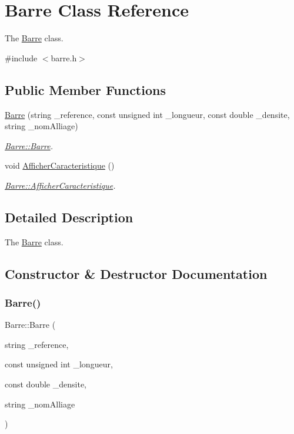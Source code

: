 \hypertarget{class_barre}{}\section{Barre Class Reference}
\label{class_barre}


The \hyperlink{class_barre}{Barre} class.  




{\ttfamily \#include $<$barre.\+h$>$}

\subsection*{Public Member Functions}
\begin{DoxyCompactItemize}
\item 
\hyperlink{class_barre_ac9742650be9a059e9291e6850c827b7a}{Barre} (string \+\_\+reference, const unsigned int \+\_\+longueur, const double \+\_\+densite, string \+\_\+nom\+Alliage)
\begin{DoxyCompactList}\small\item\em \hyperlink{class_barre_ac9742650be9a059e9291e6850c827b7a}{Barre\+::\+Barre}. \end{DoxyCompactList}\item 
void \hyperlink{class_barre_aead6bcfe08b3a9727ffc1e9a236937a9}{Afficher\+Caracteristique} ()
\begin{DoxyCompactList}\small\item\em \hyperlink{class_barre_aead6bcfe08b3a9727ffc1e9a236937a9}{Barre\+::\+Afficher\+Caracteristique}. \end{DoxyCompactList}\end{DoxyCompactItemize}


\subsection{Detailed Description}
The \hyperlink{class_barre}{Barre} class. 

\subsection{Constructor \& Destructor Documentation}
\mbox{\label{class_barre_ac9742650be9a059e9291e6850c827b7a}} 
\subsubsection{\texorpdfstring{Barre()}{Barre()}}
{\footnotesize\ttfamily Barre\+::\+Barre (\begin{DoxyParamCaption}\item[{string}]{\+\_\+reference,  }\item[{const unsigned int}]{\+\_\+longueur,  }\item[{const double}]{\+\_\+densite,  }\item[{string}]{\+\_\+nom\+Alliage }\end{DoxyParamCaption})}



